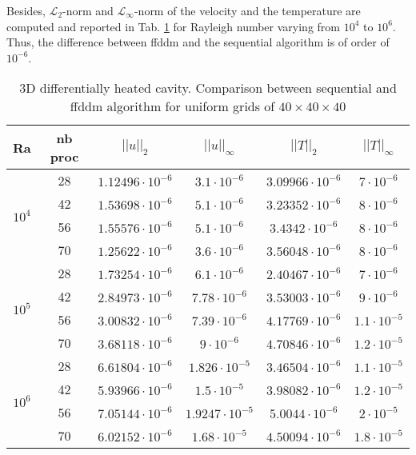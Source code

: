 Besides, $\mathcal{L}_2$-norm and $\mathcal{L}_\infty$-norm of the velocity and the temperature are computed and reported in Tab. \ref{tab-T1} for Rayleigh number varying from $10^4$ to $10^6$.
Thus, the difference between ffddm and the sequential algorithm is of order of $10^{-6}$.

\begin{table}[!h]
	\begin{center}
		\begin{tabular}{|*{6}{c|}}
			\hline
			 Ra & nb proc                     & $||u||_{2}$                        & $||u||_{\infty}$                & $||T||_{2}$              & $||T||_{\infty}$\\ \hline \hline
			\multirow{4}{*}{$10^4$} & 28 & $1.12496 \cdot 10^{-6}$ & $3.1 \cdot 10^{-6}$ & $ 3.09966 \cdot 10^{-6} $ & $7 \cdot 10^{-6}$ \\%
			\cline{2-6}
			& 42 & $1.53698 \cdot 10^{-6}$ & $5.1 \cdot 10^{-6}$ & $ 3.23352 \cdot 10^{-6} $ & $8 \cdot 10^{-6}$ \\ \cline{2-6} %
			& 56 & $1.55576 \cdot 10^{-6}$ & $5.1 \cdot 10^{-6}$ & $ 3.4342 \cdot 10^{-6} $ & $8 \cdot 10^{-6}$  \\ \cline{2-6} %
			& 70 & $1.25622 \cdot 10^{-6}$ & $3.6 \cdot 10^{-6}$ & $ 3.56048 \cdot 10^{-6} $ & $8 \cdot 10^{-6}$ \\ \hline \hline
			\multirow{4}{*}{$10^5$} & 28 & $1.73254 \cdot 10^{-6}$ & $6.1 \cdot 10^{-6}$ & $ 2.40467 \cdot 10^{-6} $ & $7 \cdot 10^{-6}$ \\%
			\cline{2-6}
			& 42 & $2.84973 \cdot 10^{-6}$ & $7.78 \cdot 10^{-6}$ & $ 3.53003 \cdot 10^{-6} $ & $9 \cdot 10^{-6}$ \\ \cline{2-6} %
			& 56 & $3.00832 \cdot 10^{-6}$ & $7.39 \cdot 10^{-6}$ & $ 4.17769 \cdot 10^{-6} $ & $1.1 \cdot 10^{-5}$  \\ \cline{2-6} %
			& 70 & $3.68118 \cdot 10^{-6}$ & $9 \cdot 10^{-6}$ & $ 4.70846 \cdot 10^{-6} $ & $1.2 \cdot 10^{-5}$ \\ \hline \hline
			\multirow{4}{*}{$10^6$} & 28 & $6.61804 \cdot 10^{-6}$ & $1.826 \cdot 10^{-5}$ & $ 3.46504\cdot 10^{-6} $ & $1.1 \cdot 10^{-5}$ \\%
			\cline{2-6}
			& 42 & $5.93966 \cdot 10^{-6}$ & $1.5 \cdot 10^{-5}$ & $ 3.98082 \cdot 10^{-6} $ & $1.2 \cdot 10^{-5}$ \\ \cline{2-6} %
			& 56 & $7.05144 \cdot 10^{-6}$ & $1.9247 \cdot 10^{-5}$ & $ 5.0044 \cdot 10^{-6} $ & $2 \cdot 10^{-5}$  \\ \cline{2-6} %
			& 70 & $6.02152 \cdot 10^{-6}$ & $1.68 \cdot 10^{-5}$ & $ 4.50094 \cdot 10^{-6} $ & $1.8 \cdot 10^{-5}$ \\ \hline
		\end{tabular}
	\end{center}
	\caption {3D differentially heated cavity. Comparison between sequential and ffddm algorithm for uniform grids of $40 \times 40 \times 40$ }
	\label{tab-T1}
\end{table}


